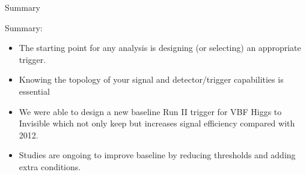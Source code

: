 \documentclass[8pt]{beamer}
\begin{document}
\begin{frame}{Summary}
 
\begin{block}{Summary:}
 
\begin{itemize}
  \item The starting point for any analysis is designing (or selecting) an appropriate trigger.
  \item Knowing the topology of your signal and detector/trigger capabilities is essential
  \item We were able to design a new baseline Run II trigger for VBF Higgs to Invisible which not only keep but increases signal efficiency
        compared with 2012.
  \item Studies are ongoing to improve baseline by reducing thresholds and adding extra conditions.
\end{itemize}

\end{block}

\end{frame}
\end{document}

